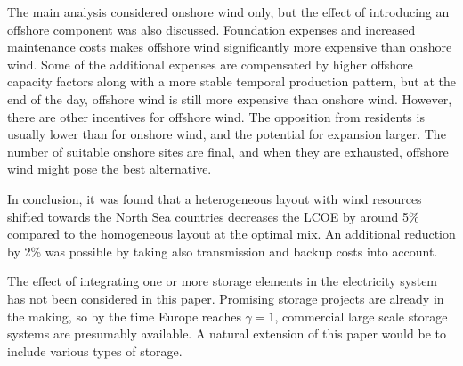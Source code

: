 \documentclass[a4paper, 5p, sort&compress]{elsarticle}%
\begin{document}
The main analysis considered onshore wind only, but the effect of
introducing an offshore component was also discussed. Foundation
expenses and increased maintenance costs makes offshore wind
significantly more expensive than onshore wind. Some of the additional
expenses are compensated by higher offshore capacity factors along
with a more stable temporal production pattern, but at the end of the
day, offshore wind is still more expensive than onshore wind. However,
there are other incentives for offshore wind. The opposition from
residents is usually lower than for onshore wind, and the potential
for expansion larger. The number of suitable onshore sites are final,
and when they are exhausted, offshore wind might pose the best
alternative.

In conclusion, it was found that a heterogeneous layout with wind
resources shifted towards the North Sea countries decreases the LCOE
by around 5\% compared to the homogeneous layout at the optimal mix. An
additional reduction by 2\% was possible by taking also transmission
and backup costs into account. \newline

The effect of integrating one or more storage elements in the
electricity system has not been considered in this paper. Promising
storage projects are already in the making, so by the time Europe reaches
$\gamma = 1$, commercial large scale storage systems are presumably
available. A natural extension of this paper would be to include
various types of storage.



\end{document}
